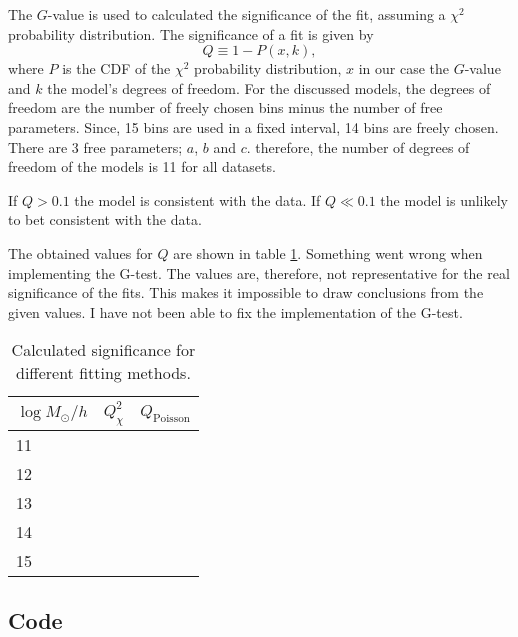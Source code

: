 The $G$-value is used to calculated the significance of the fit, assuming a $\chi^2$ probability distribution. The significance of a fit is given by
\begin{equation}
    Q \equiv 1 - P(x,k),
\end{equation}
where $P$ is the CDF of the $\chi^2$ probability distribution, $x$ in our case the $G$-value and $k$ the model's degrees of freedom. For the discussed models, the degrees of freedom are the number of freely chosen bins minus the number of free parameters. Since, 15 bins are used in a fixed interval, 14 bins are freely chosen. There are 3 free parameters; $a$, $b$ and $c$. therefore, the number of degrees of freedom of the models is 11 for all datasets. 

If $Q>0.1$ the model is consistent with the data. If $Q \ll 0.1$ the model is unlikely to bet consistent with the data.

The obtained values for $Q$ are shown in table \ref{tab:significance}. Something went wrong when implementing the G-test. The values are, therefore, not representative for the real significance of the fits. This makes it impossible to draw conclusions from the given values. I have not been able to fix the implementation of the G-test.

\begin{table}[h]
    \caption{Calculated significance for different fitting methods.}
    \label{tab:significance}
    \centering
    \begin{tabular}{l|ll}
    $\log M_\odot/h$ & \multicolumn{1}{c}{$Q_\chi^2$}                           & \multicolumn{1}{c}{$Q_\mathrm{Poisson}$}            \\ \hline
    11          &  &  \\
    12          &  &  \\
    13          &  &  \\
    14          &  &  \\
    15          &  & 
    \end{tabular}
\end{table}

\newpage

\subsection*{Code}


